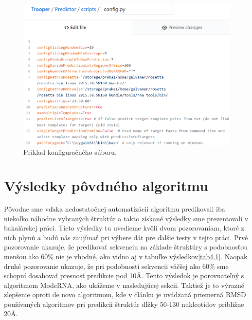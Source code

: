 \begin{figure}%
\includegraphics[width=\textwidth]{../img/config}
\caption{Príklad konfiguračného súboru.}
\label{obr04:config}
\end{figure}



\section{Výsledky pôvdného algoritmu}
Pôvodne sme vďaka nedostatočnej automatizácií algoritmu predikovali iba niekoľko náhodne vybraných štruktúr a takto získané výsledky sme prezentovali v bakalárskej práci. Tieto výsledky tu uvedieme kvôli dvom pozorovaniam, ktoré z nich plynú a budú nás zaujímať pri výbere dát pre ďalšie testy v tejto práci.
Prvé pozorovanie ukazuje, že predikovať sekvenciu na základe štruktúry s podobnosťou menšou ako 60\% nie je vhodné, ako vidno aj v tabuľke výsledkov\autoref{tab4.1}. Naopak druhé pozorovanie ukazuje, že pri podobnosti sekvencii väčšej ako 60\% sme schopní dosahovať presnosť predikcie pod 10Å. Tento výsledok je porovnateľný s algoritmom ModeRNA, ako ukážeme v nasledujúcej sekcii. Taktiež je to výrazné zlepšenie oproti de novo algoritmom, kde v článku \cite{Zhao2012} je uvádzaná priemerná RMSD používaných algoritmov pri predikcii štruktúr dĺžky 50-130 nukleotidov približne 20Å. 

